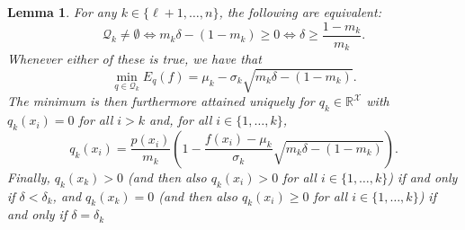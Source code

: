 \documentclass{article}
\newtheorem{lemma}{Lemma}
\begin{document}
\begin{lemma}\label{lemma:lowerexpectationchi2}
For any $k\in\{\ell+1,\ldots,n\}$, the following are equivalent:
\begin{equation*}
\mathcal{Q}_k\neq\emptyset
\Leftrightarrow
m_k\delta-(1-m_k)\geq0
\Leftrightarrow
\delta\geq\frac{1-m_k}{m_k}.
\end{equation*}
Whenever either of these is true, we have that
\begin{equation}\label{eq:lemma:lowerexpectationchi2}
    \min_{q\in\mathcal{Q}_k} E_q(f)=\mu_k-\sigma_k\sqrt{m_k\delta-(1-m_k)}.
\end{equation}
The minimum is then furthermore attained uniquely for $q_k\in\mathbb{R}^\mathcal{X}$ with $q_k(x_i)=0$ for all $i>k$ and, for all $i\in\{1,\ldots,k\}$,
\begin{equation}\label{eq:lemma:lowerexpectationchi2:qk}
    q_k(x_i)
    =\frac{p(x_i)}{m_k}\left(1-\frac{f(x_i)-\mu_k}{\sigma_k}\sqrt{m_k\delta-(1-m_k)}\right).
\end{equation}
Finally, $q_k(x_k)>0$ (and then also $q_k(x_i)>0$ for all $i\in\{1,\ldots,k\}$) if and only if $\delta<\delta_k$, and $q_k(x_k)=0$ (and then also $q_k(x_i)\geq0$ for all $i\in\{1,\ldots,k\}$) if and only if $\delta=\delta_k$
\end{lemma}
\end{document}
